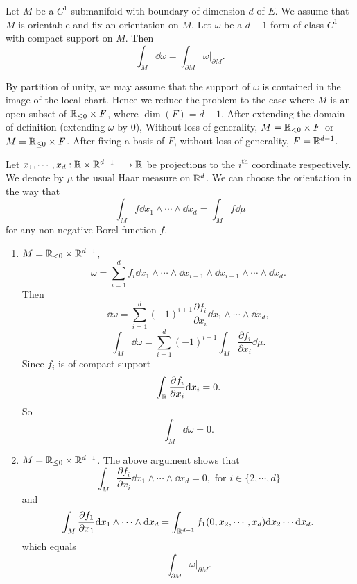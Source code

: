 \begin{theoremenv}[Stokes]
    Let $M$ be a $C^1$-submanifold with boundary of dimension $d$ of $E$.
    We assume that $M$ is orientable and fix an orientation on $M$.
    Let $\omega$ be a $d - 1$-form of class $C^1$ with compact support on $M$.
    Then
    $$\int_{M} \dd \omega = \int_{\partial M} \omega|_{\partial M}.$$
\end{theoremenv}
\begin{proofenv}
    By partition of unity, we may assume that the support of $\omega$ is contained in the image of the local chart.
    Hence we reduce the problem to the case where $M$ is an open subset of $\mathbb{R}_{\le 0} \times F$,
    where $\dim (F) = d - 1$.
    After extending the domain of definition (extending $\omega$ by $0$),
    Without loss of generality, $M = \mathbb{R}_{<0} \times F$ or $M = \mathbb{R}_{\le 0} \times F$.
    After fixing a basis of $F$, without loss of generality, $F = \mathbb{R}^{d - 1}$.

    \quad Let $x_1,\cdots,x_d : \mathbb{R} \times \mathbb{R}^{d - 1} \longrightarrow \mathbb{R}$ be projections to the $i^\text{th}$ coordinate respectively.
    We denote by $\mu$ the usual Haar measure on $\mathbb{R}^d$.
    We can choose the orientation in the way that
    $$\int_{M} f \dd x_1 \wedge \cdots \wedge \dd x_d = \int_{M} f \dd \mu$$
    for any non-negative Borel function $f$.
    \begin{enumerate}[label=\Roman*.]
        \item $M = \mathbb{R}_{<0} \times \mathbb{R}^{d - 1}$,
            $$\omega = \sum_{i=1}^{d} f_i \dd x_1 \wedge \cdots \wedge \dd x_{i - 1} \wedge \dd x_{i + 1} \wedge \cdots \wedge \dd x_d.$$
            Then
            $$\dd \omega = \sum_{i=1}^{d} (-1)^{i+1} \frac{\partial f_i}{\partial x_i} \dd x_1 \wedge \cdots \wedge \dd x_{d},$$
            $$\int_{M} \dd \omega = \sum_{i=1}^{d} (-1)^{i+1} \int_{M} \frac{\partial f_i}{\partial x_i} \dd \mu.$$
            Since $f_i$ is of compact support
            $$\int_{\mathbb{R}} \frac{\partial f_i}{\partial x_i} \mathrm{d} x_i = 0.$$
            So
            $$\int_{M} \dd \omega = 0.$$
        \item $M = \mathbb{R}_{\le 0} \times \mathbb{R}^{d - 1}$.
            The above argument shows that
            $$\int_{M} \frac{\partial f_i}{\partial x_i} \dd x_1 \wedge \cdots \wedge \dd x_d = 0, \text{ for } i \in \{2,\cdots,d\}$$
            and
            $$ \int_{M} \frac{\partial f_1}{\partial x_1} \mathrm{d} x_1 \wedge \cdots \wedge \mathrm{d} x_d = \int_{\mathbb{R}^{d-1}} f_1 (0,x_2,\cdots,x_d) \mathrm{d} x_2 \cdots \mathrm{d} x_d.$$
            which equals
            $$\int_{\partial M} \omega|_{\partial M}.$$
    \end{enumerate}
\end{proofenv}
